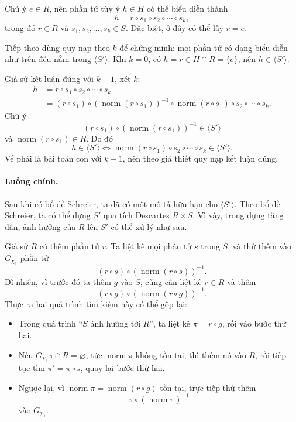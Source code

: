 \documentclass[11pt]{article}
\begin{document}
Chú ý \(e\in R\), nên phần tử tùy ý \(h\in H\) có thể biểu diễn thành
\[
  h=r\circ s_1\circ s_2\circ\cdots\circ s_k,
\]
trong đó \(r\in R\) và \(s_1,s_2,\ldots,s_k\in S\). Đặc biệt, ở đây có thể lấy
\(r=e\).

Tiếp theo dùng quy nạp theo \(k\) để chứng minh: mọi phần tử có dạng biểu diễn
như trên đều nằm trong \(\langle S'\rangle\). Khi \(k=0\), có
\(h=r\in H\cap R=\{e\}\), nên \(h\in\langle S'\rangle\).

Giả sử kết luận đúng với \(k-1\), xét \(k\):
\[
\begin{aligned}
  h
  &=r\circ s_1\circ s_2\circ\cdots\circ s_k\\
  &=(r\circ s_1)\circ(\operatorname{norm}(r\circ s_1))^{-1}
    \circ \operatorname{norm}(r\circ s_1)\circ s_2\circ\cdots\circ s_k.
\end{aligned}
\]
Chú ý
\[
  (r\circ s_1)\circ(\operatorname{norm}(r\circ s_1))^{-1}
  \in \langle S'\rangle
\]
và \(\operatorname{norm}(r\circ s_1)\in R\). Do đó
\[
  h\in\langle S'\rangle
  \Longleftrightarrow
  \operatorname{norm}(r\circ s_1)\circ s_2\circ\cdots\circ s_k
  \in\langle S'\rangle.
\]
Vế phải là bài toán con với \(k-1\), nên theo giả thiết quy nạp kết luận đúng.

\paragraph{Luồng chính.}
Sau khi có bổ đề Schreier, ta đã có một mô tả hữu hạn cho \(\langle S'\rangle\).
Theo bổ đề Schreier, ta có thể dựng \(S'\) qua tích Descartes \(R\times S\).
Vì vậy, trong dựng tăng dần, ảnh hưởng của \(R\) lên \(S'\) có thể xử lý như
sau.

Giả sử \(R\) có thêm phần tử \(r\). Ta liệt kê mọi phần tử \(s\) trong \(S\), và
thử thêm vào \(G_{\chi_1}\) phần tử
\[
  (r\circ s)\circ(\operatorname{norm}(r\circ s))^{-1}.
\]
Dĩ nhiên, vì trước đó ta thêm \(g\) vào \(S\), cũng cần liệt kê \(r\in R\) và
thêm
\[
  (r\circ g)\circ(\operatorname{norm}(r\circ g))^{-1}.
\]
Thực ra hai quá trình tìm kiếm này có thể gộp lại:
\begin{itemize}
  \item Trong quá trình ``\(S\) ảnh hưởng tới \(R\)'', ta liệt kê
  \(\pi=r\circ g\), rồi vào bước thứ hai.
  \item Nếu \(G_{\chi_1}\pi\cap R=\varnothing\), tức
  \(\operatorname{norm}\pi\) không tồn tại, thì thêm nó vào \(R\), rồi tiếp tục
  tìm \(\pi'=\pi\circ s\), quay lại bước thứ hai.
  \item Ngược lại, vì \(\operatorname{norm}\pi=\operatorname{norm}(r\circ g)\)
  tồn tại, trực tiếp thử thêm
  \[
    \pi\circ(\operatorname{norm}\pi)^{-1}
  \]
  vào \(G_{\chi_1}\).
\end{itemize}
\end{document}

